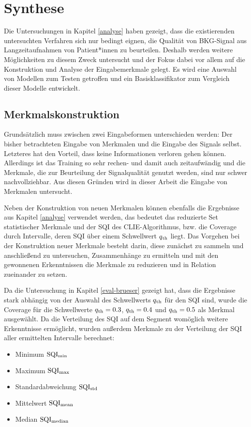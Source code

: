 \chapter{Synthese}\label{synthese}

Die Untersuchungen in Kapitel \ref{analyse} haben gezeigt, dass die existierenden untersuchten Verfahren sich nur bedingt eignen, die Qualität von \ac{BKG}-Signal aus Langzeitaufnahmen von Patient*innen zu beurteilen. Deshalb werden weitere Möglichkeiten zu diesem Zweck untersucht und der Fokus dabei vor allem auf die Konstruktion und Analyse der Eingabemerkmale gelegt. Es wird eine Auswahl von Modellen zum Testen getroffen und ein Basisklassifikator zum Vergleich dieser Modelle entwickelt.

\section{Merkmalskonstruktion}

Grundsätzlich muss zwischen zwei Eingabeformen unterschieden werden: Der bisher betrachteten Eingabe von Merkmalen und die Eingabe des Signals selbst. Letzteres hat den Vorteil, dass keine Informationen verloren gehen können. Allerdings ist das Training so sehr rechen- und damit auch zeitaufwändig und die Merkmale, die zur Beurteilung der Signalqualität genutzt werden, sind nur schwer nachvollziehbar. Aus diesen Gründen wird in dieser Arbeit die Eingabe von Merkmalen untersucht.

Neben der Konstruktion von neuen Merkmalen können ebenfalls die Ergebnisse aus Kapitel \ref{analyse} verwendet werden, das bedeutet das reduzierte Set statistischer Merkmale und der \ac{SQI} des \ac{CLIE}-Algorithmus, bzw. die Coverage durch Intervalle, deren \ac{SQI} über einem Schwellwert $q\textsubscript{th}$ liegt. Das Vorgehen bei der Konstruktion neuer Merkmale besteht darin, diese zunächst zu sammeln und anschließend zu untersuchen, Zusammenhänge zu ermitteln und mit den gewonnenen Erkenntnissen die Merkmale zu reduzieren und in Relation zueinander zu setzen.

Da die Untersuchung in Kapitel \ref{eval-brueser} gezeigt hat, dass die Ergebnisse stark abhängig von der Auswahl des Schwellwerts $q\textsubscript{th}$ für den \ac{SQI} sind, wurde die Coverage für die Schwellwerte $q\textsubscript{th} = 0.3$, $q\textsubscript{th} = 0.4$ und $q\textsubscript{th} = 0.5$ als Merkmal ausgewählt. Da die Verteilung des \ac{SQI} auf dem Segment womöglich weitere Erkenntnisse ermöglicht, wurden außerdem Merkmale zu der Verteilung der \ac{SQI} aller ermittelten Intervalle berechnet:
\begin{itemize}
	\item Minimum $\text{SQI}\textsubscript{min}$
	\item Maximum $\text{SQI}\textsubscript{max}$
	\item Standardabweichung $\text{SQI}\textsubscript{std}$
	\item Mittelwert $\text{SQI}\textsubscript{mean}$
	\item Median $\text{SQI}\textsubscript{median}$
\end{itemize}

